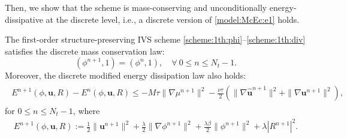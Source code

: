 Then, we show that the scheme is mass-conserving and unconditionally energy-dissipative at the discrete level, i.e., a discrete version of \eqref{model:McEc:e1} holds.
\begin{theorem} \label{thm:energy}
	The first-order  structure-preserving IVS scheme \eqref{scheme:1th:phi}--\eqref{scheme:1th:div}  satisfies the discrete mass conservation law:
	\begin{equation*}
		(\phi^{n+1},1)=(\phi^n,1), \quad \forall~  0 \le n \le N_t-1.
	\end{equation*}
	Moreover,   the discrete modified energy dissipation law also holds: 
	\begin{align*} 
		\begin{gathered}
			E^{n+1}(\phi,  \bm u, R)-E^n(\phi,  \bm u, R) \leq-  M  \tau\|\nabla \mu^{n+1}\|^2 
			- \frac{\nu \tau}{2}({\|\nabla \widehat{\bm u}^{n+1} \|^2}+\|\nabla  \bm u^{n+1} \|^2),
		\end{gathered}
	\end{align*}
	for $0 \le n \le N_t-1$, where
	\begin{align} \label{energy:mod:1st}
		E^{n+1}(\phi, \bm u, R):=\frac{1}{2} \|\bm u^{n+1}\|^2+ \frac{\lambda}{2}\|\nabla \phi^{n+1}\|^2+\frac{\lambda \beta}{2}\|\phi^{n+1}\|^2+ \lambda |R^{n+1}|^2.
	\end{align}
\end{theorem}
